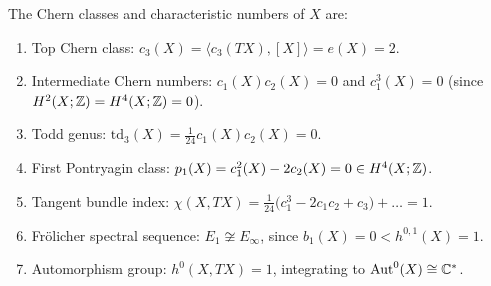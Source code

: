 \begin{theorem}\label{thm:chern-numbers}
The Chern classes and characteristic numbers of $X$ are:
\begin{enumerate}[label=(\alph*)]
    \item Top Chern class: $c_3(X) = \langle c_3(TX), [X]\rangle = e(X) = 2$.
    \item Intermediate Chern numbers: $c_1(X)c_2(X) = 0$ and $c_1^3(X) = 0$ (since $H^2(X;\mathbb{Z}) = H^4(X;\mathbb{Z}) = 0$).
    \item Todd genus: $\mathrm{td}_3(X) = \frac{1}{24} c_1(X)c_2(X) = 0$.
    \item First Pontryagin class: $p_1(X) = c_1^2(X) - 2c_2(X) = 0 \in H^4(X;\mathbb{Z})$.
    \item Tangent bundle index: $\chi(X, TX) = \frac{1}{24} \big( c_1^3 - 2c_1 c_2 + c_3 \big) + \dots = 1$.
    \item Frölicher spectral sequence: $E_1 \not\cong E_\infty$, since $b_1(X) = 0 < h^{0,1}(X) = 1$.
    \item Automorphism group: $h^0(X, TX) = 1$, integrating to $\mathrm{Aut}^0(X) \cong \mathbb{C}^*$.
\end{enumerate}
\end{theorem}

